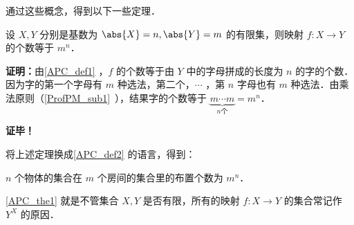 通过这些概念，得到以下一些定理．

\begin{theorem}{}\label{APC_the1}
设 $X,Y$ 分别是基数为 $\abs{X}=n,\abs{Y}=m$ 的有限集，则映射 $f:X\rightarrow Y$ 的个数等于 $m^n$．
\end{theorem}
\textbf{证明：}由\autoref{APC_def1} ，$f$ 的个数等于由 $Y$ 中的字母拼成的长度为 $n$ 的字的个数．因为字的第一个字母有 $m$ 种选法，第二个，$\cdots$ ，第 $n$ 字母也有 $m$ 种选法．由乘法原则（\autoref{ProfPM_sub1}~），结果字的个数等于 $\underbrace{m\cdots m}_{n\text{个}}=m^n$．

\textbf{证毕！}

将上述定理换成\autoref{APC_def2} 的语言，得到：
\begin{theorem}{}
$n$ 个物体的集合在 $m$ 个房间的集合里的布置个数为 $m^n$．
\end{theorem}

\autoref{APC_the1} 就是不管集合 $X,Y$ 是否有限，所有的映射 $f:X\rightarrow Y$ 的集合常记作 $Y^X$ 的原因．